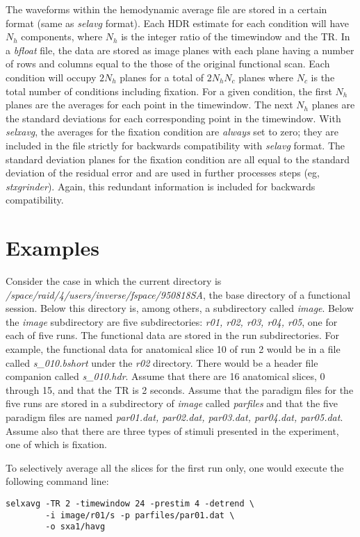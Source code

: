 \documentclass[10pt]{article}
\begin{document}
The waveforms within the hemodynamic average file are stored in a
certain format (same as {\em selavg} format).  Each HDR estimate for
each condition will have $N_h$ components, where $N_h$ is the integer
ratio of the timewindow and the TR.  In a {\em bfloat} file, the data
are stored as image planes with each plane having a number of rows and
columns equal to the those of the original functional scan.  Each
condition will occupy $2 N_h$ planes for a total of $2 N_h N_c $
planes where $N_c$ is the total number of conditions including
fixation.  For a given condition, the first $N_h$ planes are the
averages for each point in the timewindow.  The next $N_h$ planes are
the standard deviations for each corresponding point in the
timewindow.  With {\em selxavg}, the averages for the fixation
condition are {\em always} set to zero; they are included in the file
strictly for backwards compatibility with {\em selavg} format.  The
standard deviation planes for the fixation condition are all equal to
the standard deviation of the residual error and are used in further
processes steps (eg, {\em stxgrinder}).  Again, this redundant
information is included for backwards compatibility.

\section{Examples}

Consider the case in which the current directory is {\em
/space/raid/4/users/inverse/fspace/950818SA}, the base directory of a
functional session.  Below this directory is, among others, a
subdirectory called {\em image}.  Below the {\em image} subdirectory
are five subdirectories: {\em r01, r02, r03, r04, r05}, one for each
of five runs.  The functional data are stored in the run
subdirectories.  For example, the functional data for anatomical slice
10 of run 2 would be in a file called {\em s\_010.bshort} under the
{\em r02} directory.  There would be a header file companion called
{\em s\_010.hdr}.  Assume that there are 16 anatomical slices, 0
through 15, and that the TR is 2 seconds.  Assume that the paradigm
files for the five runs are stored in a subdirectory of {\em image}
called {\em parfiles} and that the five paradigm files are named {\em
par01.dat, par02.dat, par03.dat, par04.dat, par05.dat}.  Assume also
that there are three types of stimuli presented in the experiment, one
of which is fixation.

To selectively average all the slices for the first run only, one
would execute the following command line:
\begin{verbatim}
selxavg -TR 2 -timewindow 24 -prestim 4 -detrend \
        -i image/r01/s -p parfiles/par01.dat \
        -o sxa1/havg 
\end{verbatim}
\end{document}
